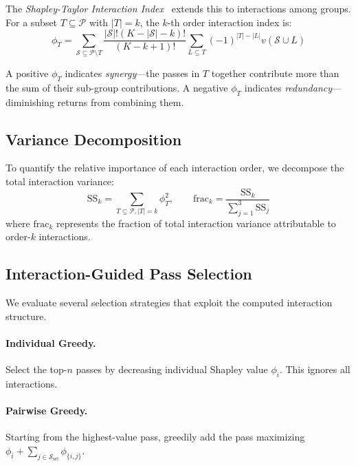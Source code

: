 \documentclass[preprint]{article}
\newcommand{\shapval}{\phi}
\newcommand{\passset}{\mathcal{S}}
\newcommand{\allpasses}{\mathcal{P}}
\newcommand{\valfn}{v}
\begin{document}
The \emph{Shapley-Taylor Interaction Index}~\citep{sundararajan2020shapley} extends this to interactions among groups. For a subset $T \subseteq \allpasses$ with $|T| = k$, the $k$-th order interaction index is:
\begin{equation}
    \shapval_T = \sum_{\passset \subseteq \allpasses \setminus T} \frac{|\passset|!(K - |\passset| - k)!}{(K - k + 1)!} \sum_{L \subseteq T} (-1)^{|T| - |L|} \valfn(\passset \cup L)
\end{equation}

A positive $\shapval_T$ indicates \emph{synergy}---the passes in $T$ together contribute more than the sum of their sub-group contributions. A negative $\shapval_T$ indicates \emph{redundancy}---diminishing returns from combining them.

\subsection{Variance Decomposition}

To quantify the relative importance of each interaction order, we decompose the total interaction variance:
\begin{equation}
    \text{SS}_k = \sum_{T \subseteq \allpasses, |T|=k} \shapval_T^2, \qquad
    \text{frac}_k = \frac{\text{SS}_k}{\sum_{j=1}^{3} \text{SS}_j}
\end{equation}
where $\text{frac}_k$ represents the fraction of total interaction variance attributable to order-$k$ interactions.

\subsection{Interaction-Guided Pass Selection}

We evaluate several selection strategies that exploit the computed interaction structure.

\paragraph{Individual Greedy.} Select the top-$n$ passes by decreasing individual Shapley value $\shapval_i$. This ignores all interactions.

\paragraph{Pairwise Greedy.} Starting from the highest-value pass, greedily add the pass maximizing $\shapval_i + \sum_{j \in \passset_{\text{sel}}} \shapval_{\{i,j\}}$.
\end{document}
